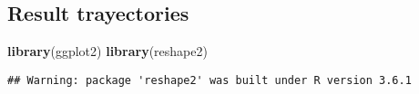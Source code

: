 \documentclass[]{article}
\newenvironment{Shaded}{\begin{snugshade}}{\end{snugshade}}
\newcommand{\KeywordTok}[1]{\textcolor[rgb]{0.13,0.29,0.53}{\textbf{#1}}}
\newcommand{\NormalTok}[1]{#1}
\begin{document}
\hypertarget{result-trayectories}{%
\subsection{Result trayectories}\label{result-trayectories}}

\begin{Shaded}
\begin{Highlighting}[]
\KeywordTok{library}\NormalTok{(ggplot2)}
\KeywordTok{library}\NormalTok{(reshape2)}
\end{Highlighting}
\end{Shaded}

\begin{verbatim}
## Warning: package 'reshape2' was built under R version 3.6.1
\end{verbatim}
\end{document}
